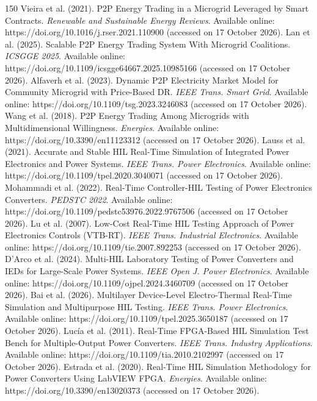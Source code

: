 \begin{thebibliography}{150}
Vieira et al. (2021). P2P Energy Trading in a Microgrid Leveraged by Smart Contracts. \textit{Renewable and Sustainable Energy Reviews}. Available online: https://doi.org/10.1016/j.rser.2021.110900 (accessed on 17 October 2026).
Lan et al. (2025). Scalable P2P Energy Trading System With Microgrid Coalitions. \textit{ICSGGE 2025}. Available online: https://doi.org/10.1109/icsgge64667.2025.10985166 (accessed on 17 October 2026).
Alfaverh et al. (2023). Dynamic P2P Electricity Market Model for Community Microgrid with Price-Based DR. \textit{IEEE Trans. Smart Grid}. Available online: https://doi.org/10.1109/tsg.2023.3246083 (accessed on 17 October 2026).
Wang et al. (2018). P2P Energy Trading Among Microgrids with Multidimensional Willingness. \textit{Energies}. Available online: https://doi.org/10.3390/en11123312 (accessed on 17 October 2026).
Lauss et al. (2021). Accurate and Stable HIL Real-Time Simulation of Integrated Power Electronics and Power Systems. \textit{IEEE Trans. Power Electronics}. Available online: https://doi.org/10.1109/tpel.2020.3040071 (accessed on 17 October 2026).
Mohammadi et al. (2022). Real-Time Controller-HIL Testing of Power Electronics Converters. \textit{PEDSTC 2022}. Available online: https://doi.org/10.1109/pedstc53976.2022.9767506 (accessed on 17 October 2026).
Lu et al. (2007). Low-Cost Real-Time HIL Testing Approach of Power Electronics Controls (VTB-RT). \textit{IEEE Trans. Industrial Electronics}. Available online: https://doi.org/10.1109/tie.2007.892253 (accessed on 17 October 2026).
D'Arco et al. (2024). Multi-HIL Laboratory Testing of Power Converters and IEDs for Large-Scale Power Systems. \textit{IEEE Open J. Power Electronics}. Available online: https://doi.org/10.1109/ojpel.2024.3460709 (accessed on 17 October 2026).
Bai et al. (2026). Multilayer Device-Level Electro-Thermal Real-Time Simulation and Multipurpose HIL Testing. \textit{IEEE Trans. Power Electronics}. Available online: https://doi.org/10.1109/tpel.2025.3650187 (accessed on 17 October 2026).
Lucía et al. (2011). Real-Time FPGA-Based HIL Simulation Test Bench for Multiple-Output Power Converters. \textit{IEEE Trans. Industry Applications}. Available online: https://doi.org/10.1109/tia.2010.2102997 (accessed on 17 October 2026).
Estrada et al. (2020). Real-Time HIL Simulation Methodology for Power Converters Using LabVIEW FPGA. \textit{Energies}. Available online: https://doi.org/10.3390/en13020373 (accessed on 17 October 2026).

\end{thebibliography}

